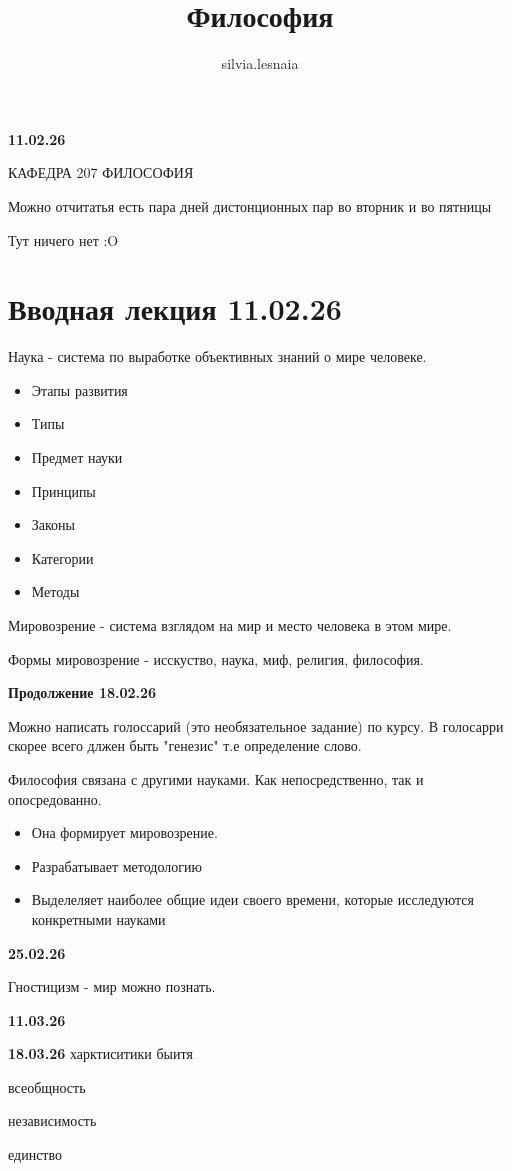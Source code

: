 \documentclass{article}
\title{Философия}
\author{silvia.lesnaia }
\begin{document}
\maketitle

\textbf{11.02.26}

КАФЕДРА 207 ФИЛОСОФИЯ

Можно отчитатья есть пара дней дистонционных пар во вторник и во пятницы

Тут ничего нет :O


\section{Вводная лекция \textbf{11.02.26}} 

Наука - система по выработке объективных знаний о мире человеке. 

\begin{itemize}
    \item Этапы развития
    \item Типы
    \item Предмет науки 
    \item Принципы 
    \item Законы 
    \item Категории 
    \item Методы 
\end{itemize}

Мировозрение - система взглядом на мир и место человека в этом мире. 

Формы мировозрение - исскуство, наука, миф, религия, философия. 

\vspace{1cm}

\textbf{Продолжение 18.02.26}

Можно написать голоссарий (это необязательное задание) по курсу. В голосарри скорее всего 
длжен быть "генезис" т.е определение слово. 

Философия связана с другими науками. Как непосредственно, так и опосредованно. 

\begin{itemize}
    \item Она формирует мировозрение. 
    \item Разрабатывает методологию 
    \item Выделеляет наиболее общие идеи своего времени, которые исследуются конкретными науками
\end{itemize}

\textbf{25.02.26}

Гностицизм - мир можно познать. 


\textbf{11.03.26}



\textbf{18.03.26}
харктиситики быитя 

всеобщность 

независимость 

единство 
\end{document}
